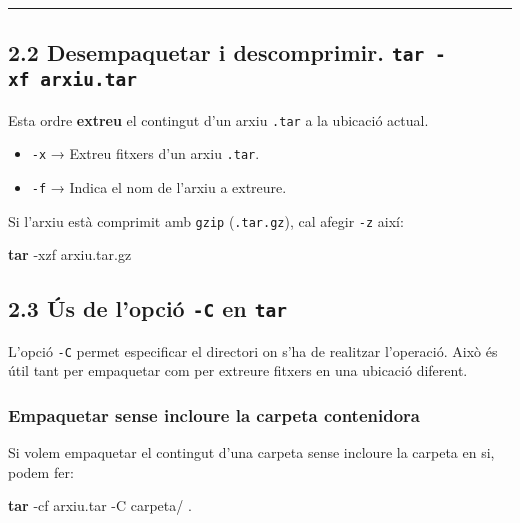 \documentclass[
  12 pt,
  a4paper,
]{article}
\newenvironment{Shaded}{\begin{snugshade}}{\end{snugshade}}
\newcommand{\AttributeTok}[1]{\textcolor[rgb]{0.13,0.29,0.53}{#1}}
\newcommand{\FunctionTok}[1]{\textcolor[rgb]{0.13,0.29,0.53}{\textbf{#1}}}
\newcommand{\NormalTok}[1]{#1}
\providecommand{\tightlist}{%
  \setlength{\itemsep}{0pt}\setlength{\parskip}{0pt}}
\begin{document}
\begin{center}\rule{0.5\linewidth}{0.5pt}\end{center}

\subsection{\texorpdfstring{2.2 Desempaquetar i descomprimir.
\texttt{tar\ -xf\ arxiu.tar}}{2.2 Desempaquetar i descomprimir. tar -xf arxiu.tar}}\label{desempaquetar-i-descomprimir.-tar--xf-arxiu.tar}

Esta ordre \textbf{extreu} el contingut d'un arxiu \texttt{.tar} a la
ubicació actual.

\begin{itemize}
\tightlist
\item
  \texttt{-x} → Extreu fitxers d'un arxiu \texttt{.tar}.\\
\item
  \texttt{-f} → Indica el nom de l'arxiu a extreure.
\end{itemize}

Si l'arxiu està comprimit amb \texttt{gzip} (\texttt{.tar.gz}), cal
afegir \texttt{-z} així:

\begin{Shaded}
\begin{Highlighting}[]
\FunctionTok{tar} \AttributeTok{{-}xzf}\NormalTok{ arxiu.tar.gz}
\end{Highlighting}
\end{Shaded}

\subsection{\texorpdfstring{2.3 Ús de l'opció \texttt{-C} en
\texttt{tar}}{2.3 Ús de l'opció -C en tar}}\label{uxfas-de-lopciuxf3--c-en-tar}

L'opció \texttt{-C} permet especificar el directori on s'ha de realitzar
l'operació. Això és útil tant per empaquetar com per extreure fitxers en
una ubicació diferent.

\subsubsection{Empaquetar sense incloure la carpeta
contenidora}\label{empaquetar-sense-incloure-la-carpeta-contenidora}

Si volem empaquetar el contingut d'una carpeta sense incloure la carpeta
en si, podem fer:

\begin{Shaded}
\begin{Highlighting}[]
\FunctionTok{tar} \AttributeTok{{-}cf}\NormalTok{ arxiu.tar }\AttributeTok{{-}C}\NormalTok{ carpeta/ .}
\end{Highlighting}
\end{Shaded}
\end{document}
